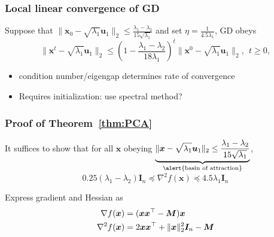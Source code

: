 \documentclass[compress,
mathserif,wide,%
]{beamer}
\begin{document}

\begin{frame}
	\frametitle{Local linear convergence of GD}
	\begin{theorem}\label{thm:PCA}
	Suppose that $\|\bm{x}_{0} - \sqrt{\lambda_1} \bm{u}_{1} \|_{2} \leq \frac{\lambda_{1}-\lambda_{2}}{15\sqrt{\lambda_{1}}}$ and set $\eta = \frac{1}{ 4.5 \lambda_{1} }$, GD obeys
	\[
	\big\|\bm{x}^{t}-\sqrt{\lambda_{1}}\bm{u}_{1}\big\|_{2}\leq\left(1-\frac{\lambda_{1}-\lambda_{2}}{18\lambda_{1}}\right)^{t}\big\|\bm{x}^{0}-\sqrt{\lambda_{1}}\bm{u}_{1}\big\|_{2}, ~~ t\geq 0,
\]
	\end{theorem}
	
	\vfill
	
	\begin{itemize}
		\item condition number/eigengap determines rate of convergence
		\item Requires initialization: use spectral method?
	\end{itemize}
\end{frame}

\begin{frame}
	\frametitle{Proof of Theorem~\ref{thm:PCA}}
	It suffices to show that for all $\bm{x}$ obeying $\underbrace{\|\bm{x} - \sqrt{\lambda_1} \bm{u}_{1} \|_2 \leq \frac{\lambda_{1}-\lambda_{2}}{15\sqrt{\lambda_{1}}}}_{\text{\alert{basin of attraction}}}$, 
\[
	0.25(\lambda_{1}-\lambda_{2})\bm{I}_n \preceq \nabla^2 f(\bm{x})\preceq4.5\lambda_1 \bm{I}_n
\]

	\vfill
	Express gradient and Hessian as
	\begin{align*}
		\nabla f({\bm x}) &= ({\bm x}{\bm x}^{\top}-{\bm M}) {\bm x} \\
		\nabla^2 f({\bm x}) &= 2{\bm x}{\bm x}^{\top} + \|\bm{x}\|_2^2 \bm{I}_{n} - {\bm M}
	\end{align*}
	
\end{frame}
\end{document}
